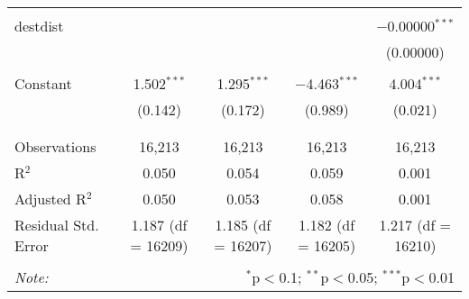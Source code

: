 \begin{table}[!htbp]
\begin{tabular}{@{\extracolsep{5pt}}lcccc}
  & & & & \\ 
 destdist &  &  &  & $-$0.00000$^{***}$ \\ 
  &  &  &  & (0.00000) \\ 
  & & & & \\ 
 Constant & 1.502$^{***}$ & 1.295$^{***}$ & $-$4.463$^{***}$ & 4.004$^{***}$ \\ 
  & (0.142) & (0.172) & (0.989) & (0.021) \\ 
  & & & & \\ 
\hline \\[-1.8ex] 
Observations & 16,213 & 16,213 & 16,213 & 16,213 \\ 
R$^{2}$ & 0.050 & 0.054 & 0.059 & 0.001 \\ 
Adjusted R$^{2}$ & 0.050 & 0.053 & 0.058 & 0.001 \\ 
Residual Std. Error & 1.187 (df = 16209) & 1.185 (df = 16207) & 1.182 (df = 16205) & 1.217 (df = 16210) \\ 
\hline 
\hline \\[-1.8ex] 
\textit{Note:}  & \multicolumn{4}{r}{$^{*}$p$<$0.1; $^{**}$p$<$0.05; $^{***}$p$<$0.01} \\ 
\end{tabular} 
\end{table} 
